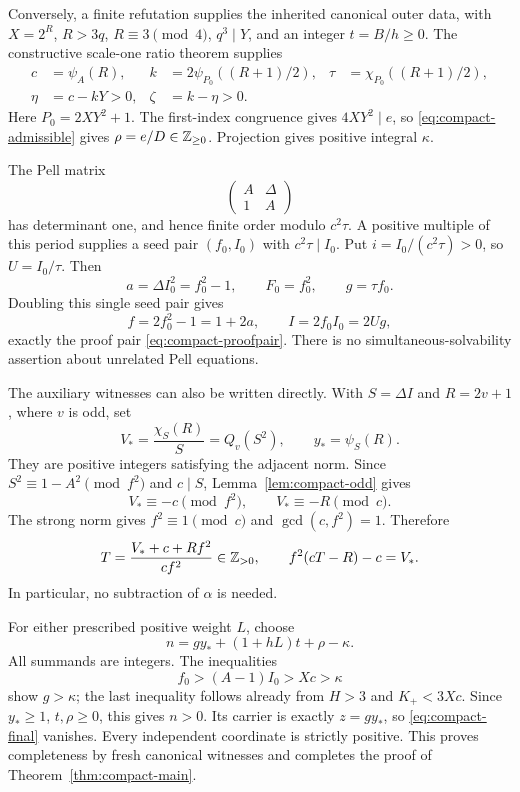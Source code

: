 Conversely, a finite refutation supplies the inherited canonical outer
data, with \(X=2^R\), \(R>3q\), \(R\equiv3\pmod4\),
\(q^3\mid Y\), and an integer \(t=B/h\ge0\).
The constructive scale-one ratio theorem supplies
\begin{align*}
 c&=\psi_A(R),&
 k&=2\psi_{P_0}((R+1)/2),&
 \tau&=\chi_{P_0}((R+1)/2),\\
 \eta&=c-kY>0,&\zeta&=k-\eta>0.
\end{align*}
Here \(P_0=2XY^2+1\).  The first-index congruence gives
\(4XY^2\mid e\), so \eqref{eq:compact-admissible} gives
\(\rho=e/D\in\mathbb Z_{\ge0}\).  Projection gives positive integral
\(\kappa\).

The Pell matrix
\[
 \begin{pmatrix}A&\Delta\\1&A\end{pmatrix}
\]
has determinant one, and hence finite order modulo \(c^2\tau\).
A positive multiple of this period supplies a seed pair \((f_0,I_0)\)
with \(c^2\tau\mid I_0\).  Put \(i=I_0/(c^2\tau)>0\), so
\(U=I_0/\tau\).  Then
\[
 a=\Delta I_0^2=f_0^2-1,\qquad
 F_0=f_0^2,\qquad g=\tau f_0.
\]
Doubling this single seed pair gives
\[
 f=2f_0^2-1=1+2a,\qquad
 I=2f_0I_0=2Ug,
\]
exactly the proof pair \eqref{eq:compact-proofpair}.  There is no
simultaneous-solvability assertion about unrelated Pell equations.

The auxiliary witnesses can also be written directly.  With
\(S=\Delta I\) and \(R=2v+1\), where \(v\) is odd, set
\[
 V_*=\frac{\chi_S(R)}{S}=Q_v(S^2),\qquad
 y_* =\psi_S(R).
\]
They are positive integers satisfying the adjacent norm.  Since
\(S^2\equiv1-A^2\pmod{f^2}\) and \(c\mid S\),
Lemma~\ref{lem:compact-odd} gives
\[
 V_*\equiv-c\pmod{f^2},\qquad V_*\equiv-R\pmod c.
\]
The strong norm gives \(f^2\equiv1\pmod c\) and
\(\gcd(c,f^2)=1\).  Therefore
\begin{equation}
 T=\frac{V_*+c+Rf^2}{cf^2}\in\mathbb Z_{>0},\qquad
 f^2(cT-R)-c=V_* .                              \label{eq:compact-Tcomplete}
\end{equation}
In particular, no subtraction of \(\alpha\) is needed.

For either prescribed positive weight \(L\), choose
\[
 n=gy_*+(1+hL)t+\rho-\kappa.
\]
All summands are integers.  The inequalities
\[
 f_0>(A-1)I_0>Xc>\kappa
\]
show \(g>\kappa\); the last inequality follows already from
\(H>3\) and \(K_+<3Xc\).  Since \(y_*\ge1\), \(t,\rho\ge0\),
this gives \(n>0\).  Its carrier is exactly \(z=gy_*\), so
\eqref{eq:compact-final} vanishes.  Every independent coordinate is
strictly positive.  This proves completeness by fresh canonical
witnesses and completes the proof of Theorem~\ref{thm:compact-main}.

